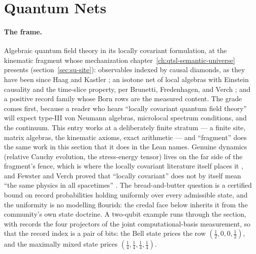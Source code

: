 

\section{Quantum Nets}
\label{sec:mt-qnet}

\paragraph{The frame.} Algebraic quantum field theory in its locally
covariant formulation, at the kinematic fragment whose mechanization
chapter~\ref{ch:qtsl-semantic-universe} presents
(section~\ref{sec:su-site}): observables indexed by causal diamonds,
as they have been since Haag and Kastler \cite{haagkastler64}; an
isotone net of local algebras with Einstein causality and the
time-slice property, per Brunetti, Fredenhagen, and Verch
\cite{brunetti01}; and a positive record family whose Born rows are
the measured content. The grade comes first, because a reader who
hears ``locally covariant quantum field theory'' will expect
type-III von Neumann algebras, microlocal spectrum conditions, and
the continuum. This entry works at a deliberately finite stratum ---
a finite site, matrix algebras, the kinematic axioms, exact
arithmetic --- and ``fragment'' does the same work in this section
that it does in the Lean names. Genuine dynamics (relative Cauchy
evolution, the stress-energy tensor) lives on the far side of the
fragment's fence, which is where the locally covariant literature
itself places it \cite{fewster15}, and Fewster and Verch proved that
``locally covariant'' does not by itself mean ``the same physics in
all spacetimes'' \cite{fewster11}. The bread-and-butter question is
a certified bound on record probabilities holding uniformly over
every admissible state, and the uniformity is no modelling flourish:
the credal face below inherits it from the community's own state
doctrine. A two-qubit example runs through the section, with records
the four projectors of the joint computational-basis measurement, so
that the record index is a pair of bits: the Bell state prices the
row $(\tfrac12, 0, 0, \tfrac12)$, and the maximally mixed state
prices $(\tfrac14, \tfrac14, \tfrac14, \tfrac14)$.

